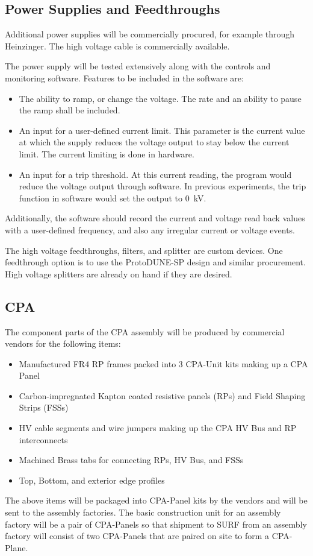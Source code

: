\subsection{Power Supplies and Feedthroughs}
\label{sec:fdsp-hv-supplies-feedthroughs}

Additional power supplies will be commercially procured, for example through Heinzinger. The high voltage cable is commercially available.

The power supply will be tested extensively along with the controls and monitoring software.  Features to be included in the software are:
\begin{itemize}
\item The ability to ramp, or change the voltage.  The rate and an ability to pause the ramp shall be included.
\item An input for a user-defined current limit.  This parameter is the current value at which the supply reduces the voltage output to stay below the current limit.  The current limiting is done in hardware.
\item An input for a trip threshold.  At this current reading, the program would reduce the voltage output through software.  In previous experiments, the trip function in software would set the output to \SI{0}{kV}.
\end{itemize}
\noindent Additionally, the software should record the current and voltage read back values with a user-defined frequency, and also any irregular current or voltage events.

The high voltage feedthroughs, filters, and splitter are custom devices.  One feedthrough option is to use the ProtoDUNE-SP design and similar procurement.  High voltage splitters are already on hand if they are desired.

\subsection{CPA}
\label{sec:fdsp-hv-prod-cpa}

The component parts of the CPA assembly will be produced by commercial vendors for the following items:
\begin{itemize}
\item Manufactured FR4 RP frames packed into 3 CPA-Unit kits making up a CPA Panel
\item Carbon-impregnated Kapton coated resistive panels (RPs) and Field Shaping Strips (FSSs)
\item HV cable segments and wire jumpers making up the CPA HV Bus and RP interconnects
\item Machined Brass tabs for connecting RPs, HV Bus, and FSSs
\item Top, Bottom, and exterior edge profiles
\end{itemize}
The above items will be packaged into CPA-Panel kits by the vendors and will be sent to the assembly factories.  The basic construction unit for an assembly factory will be a pair of CPA-Panels so that shipment to SURF from an assembly factory will consist of two CPA-Panels that are paired on site to form a CPA-Plane.

